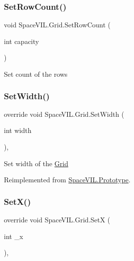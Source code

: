 \subsubsection{\texorpdfstring{Set\+Row\+Count()}{SetRowCount()}}
{\footnotesize\ttfamily void Space\+V\+I\+L.\+Grid.\+Set\+Row\+Count (\begin{DoxyParamCaption}\item[{int}]{capacity }\end{DoxyParamCaption})\hspace{0.3cm}{\ttfamily [inline]}}



Set count of the rows 

\mbox{\label{class_space_v_i_l_1_1_grid_a2d3ce59b92ad9ca3bba2fb69feb549cb}} 
\subsubsection{\texorpdfstring{Set\+Width()}{SetWidth()}}
{\footnotesize\ttfamily override void Space\+V\+I\+L.\+Grid.\+Set\+Width (\begin{DoxyParamCaption}\item[{int}]{width }\end{DoxyParamCaption})\hspace{0.3cm}{\ttfamily [inline]}, {\ttfamily [virtual]}}



Set width of the \mbox{\hyperlink{class_space_v_i_l_1_1_grid}{Grid}} 



Reimplemented from \mbox{\hyperlink{class_space_v_i_l_1_1_prototype_a6a4f1b9581f4d18f1c3a3e287d4b2a2b}{Space\+V\+I\+L.\+Prototype}}.

\mbox{\label{class_space_v_i_l_1_1_grid_a28b973b0fddabf73166c9a24946e2e59}} 
\subsubsection{\texorpdfstring{Set\+X()}{SetX()}}
{\footnotesize\ttfamily override void Space\+V\+I\+L.\+Grid.\+SetX (\begin{DoxyParamCaption}\item[{int}]{\+\_\+x }\end{DoxyParamCaption})\hspace{0.3cm}{\ttfamily [inline]}, {\ttfamily [virtual]}}



